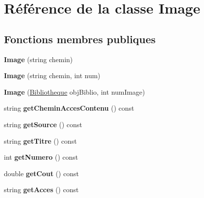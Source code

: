\hypertarget{classImage}{}\section{Référence de la classe Image}
\label{classImage}
\subsection*{Fonctions membres publiques}
\begin{DoxyCompactItemize}
\item 
\mbox{\label{classImage_ab8bebbdcb43aa322e55c8a3cded3c377}} 
{\bfseries Image} (string chemin)
\item 
\mbox{\label{classImage_a6dc2c0114dcc89fabe7f567c3ce182cf}} 
{\bfseries Image} (string chemin, int num)
\item 
\mbox{\label{classImage_a9fafba700bf9a2526fc05da633b021e1}} 
{\bfseries Image} (\hyperlink{classBibliotheque}{Bibliotheque} obj\+Biblio, int num\+Image)
\item 
\mbox{\label{classImage_a920335e8035be76d6281ef0eca1ce14b}} 
string {\bfseries get\+Chemin\+Acces\+Contenu} () const
\item 
\mbox{\label{classImage_a2b7c1ffbc1c9054ee69b22ca6293a1f6}} 
string {\bfseries get\+Source} () const
\item 
\mbox{\label{classImage_afb9790bb10f24355f126c47fbf2949a6}} 
string {\bfseries get\+Titre} () const
\item 
\mbox{\label{classImage_a1a3e6be4de21a7bfc13e0f7c8f83320f}} 
int {\bfseries get\+Numero} () const
\item 
\mbox{\label{classImage_ad9997dad34216a0c98517c93857b9001}} 
double {\bfseries get\+Cout} () const
\item 
\mbox{\label{classImage_ac788c2fb4b9c035a0f2cdf11a0d91c3a}} 
string {\bfseries get\+Acces} () const
\item 
\mbox{\label{classImage_a30126356f24aa2ee5732001bd160755f}} 

\end{DoxyCompactItemize}
